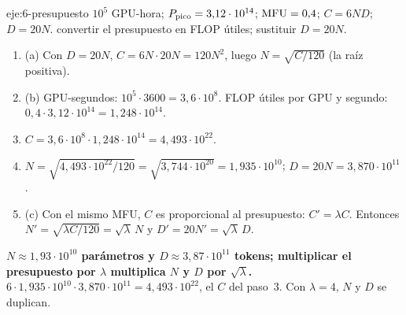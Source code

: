 \begin{solucion}{eje:6-presupuesto}
\datos $10^{5}$ GPU-hora; $P_{\mathrm{pico}}=3{,}12\cdot 10^{14}$; $\mathrm{MFU}=0{,}4$; $C=6ND$; $D=20N$.
\planteamiento convertir el presupuesto en FLOP útiles; sustituir $D=20N$.
\pasos
\begin{enumerate}[label=\arabic*.]
  \item (a) Con $D=20N$, $C=6N\cdot 20N=120N^{2}$, luego $N=\sqrt{C/120}$ (la raíz positiva).
  \item (b) GPU-segundos: $10^{5}\cdot 3600=3{,}6\cdot 10^{8}$. FLOP útiles por GPU y segundo: $0{,}4\cdot 3{,}12\cdot 10^{14}=1{,}248\cdot 10^{14}$.
  \item $C=3{,}6\cdot 10^{8}\cdot 1{,}248\cdot 10^{14}=4{,}493\cdot 10^{22}$.
  \item $N=\sqrt{4{,}493\cdot 10^{22}/120}=\sqrt{3{,}744\cdot 10^{20}}=1{,}935\cdot 10^{10}$; $D=20N=3{,}870\cdot 10^{11}$.
  \item (c) Con el mismo MFU, $C$ es proporcional al presupuesto: $C'=\lambda C$. Entonces $N'=\sqrt{\lambda C/120}=\sqrt{\lambda}\,N$ y $D'=20N'=\sqrt{\lambda}\,D$. \qedhere
\end{enumerate}
\resultado \textbf{$N\approx 1{,}93\cdot 10^{10}$ parámetros y $D\approx 3{,}87\cdot 10^{11}$ tokens; multiplicar el presupuesto por $\lambda$ multiplica $N$ y $D$ por $\sqrt{\lambda}$.}
\comprobacion $6\cdot 1{,}935\cdot 10^{10}\cdot 3{,}870\cdot 10^{11}=4{,}493\cdot 10^{22}$, el $C$ del paso~3. Con $\lambda=4$, $N$ y $D$ se duplican.
\end{solucion}
